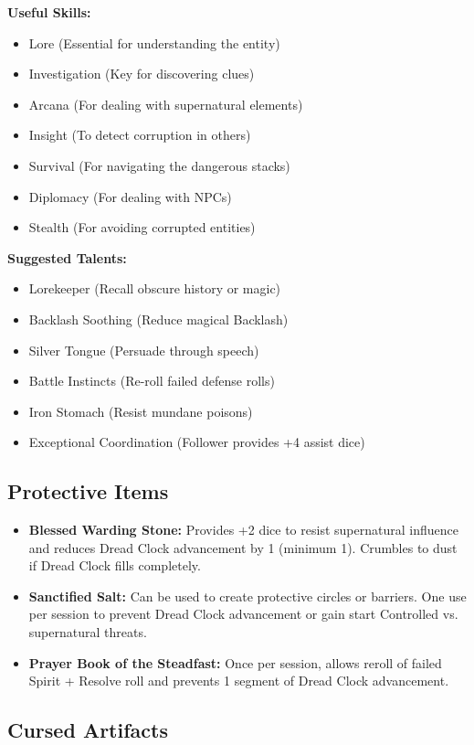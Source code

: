 \documentclass[11pt]{article}
\begin{document}
\textbf{Useful Skills:}
\begin{itemize}
\item Lore (Essential for understanding the entity)
\item Investigation (Key for discovering clues)
\item Arcana (For dealing with supernatural elements)
\item Insight (To detect corruption in others)
\item Survival (For navigating the dangerous stacks)
\item Diplomacy (For dealing with NPCs)
\item Stealth (For avoiding corrupted entities)
\end{itemize}

\textbf{Suggested Talents:}
\begin{itemize}
\item Lorekeeper (Recall obscure history or magic)
\item Backlash Soothing (Reduce magical Backlash)
\item Silver Tongue (Persuade through speech)
\item Battle Instincts (Re-roll failed defense rolls)
\item Iron Stomach (Resist mundane poisons)
\item Exceptional Coordination (Follower provides +4 assist dice)
\end{itemize}

\subsection{Protective Items}

\begin{itemize}
\item \textbf{Blessed Warding Stone:} Provides +2 dice to resist supernatural influence and reduces Dread Clock advancement by 1 (minimum 1). Crumbles to dust if Dread Clock fills completely.
\item \textbf{Sanctified Salt:} Can be used to create protective circles or barriers. One use per session to prevent Dread Clock advancement or gain start Controlled vs. supernatural threats.
\item \textbf{Prayer Book of the Steadfast:} Once per session, allows reroll of failed Spirit + Resolve roll and prevents 1 segment of Dread Clock advancement.
\end{itemize}

\subsection{Cursed Artifacts}
\end{document}
